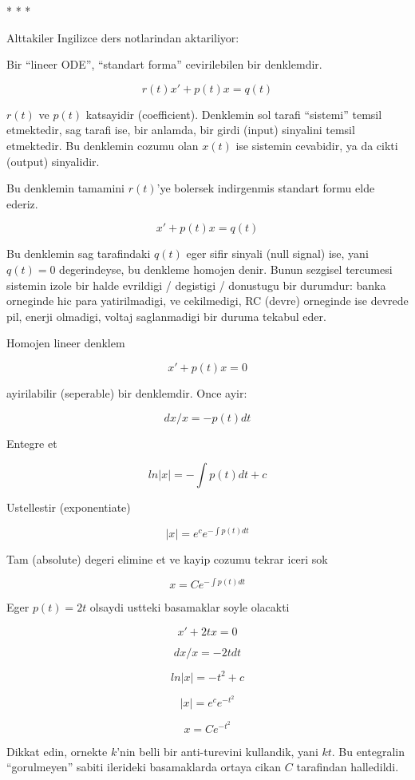 \documentclass[12pt,fleqn]{article}
\begin{document}
* * *

Alttakiler Ingilizce ders notlarindan aktariliyor:

Bir ``lineer ODE'', ``standart forma'' cevirilebilen bir denklemdir.

\[ r(t)x' + p(t)x = q(t) \]

$r(t)$ ve $p(t)$ katsayidir (coefficient). Denklemin sol tarafi ``sistemi''
temsil etmektedir, sag tarafi ise, bir anlamda, bir girdi (input) sinyalini
temsil etmektedir. Bu denklemin cozumu olan $x(t)$ ise sistemin cevabidir,
ya da cikti (output) sinyalidir. 

Bu denklemin tamamini $r(t)$'ye bolersek indirgenmis standart formu elde
ederiz. 

\[ x' + p(t)x = q(t) \]

Bu denklemin sag tarafindaki $q(t)$ eger sifir sinyali (null signal) ise,
yani $q(t) = 0$ degerindeyse, bu denkleme homojen denir. Bunun sezgisel
tercumesi sistemin izole bir halde evrildigi / degistigi / donustugu bir
durumdur: banka orneginde hic para yatirilmadigi, ve cekilmedigi, RC
(devre) orneginde ise devrede pil, enerji olmadigi, voltaj saglanmadigi bir
duruma tekabul eder. 

Homojen lineer denklem

\begin{equation}\label{4eq1}
x' + p(t) x = 0 
\end{equation}

ayirilabilir (seperable) bir denklemdir. Once ayir:

\[ dx/x = - p(t) dt \]

Entegre et

\[ ln|x| = - \int p(t) dt + c \]

Ustellestir (exponentiate)

\[ |x| = e^c e^{ - \int p(t) dt } \]

Tam (absolute) degeri elimine et ve kayip cozumu tekrar iceri sok

\[ x = C e^{- \int p(t) dt} \]

Eger $p(t) = 2t$ olsaydi ustteki basamaklar soyle olacakti

\[ x' + 2tx = 0 \]

\[ dx/x = - 2t dt \]

\[ ln|x| = - t^2 + c \]

\[ |x| = e^c e^{-t^2} \]

\[ x = C e^{-t^2} \]

Dikkat edin, ornekte $k$'nin belli bir anti-turevini kullandik, yani
$kt$. Bu entegralin ``gorulmeyen'' sabiti ilerideki basamaklarda ortaya
cikan $C$ tarafindan halledildi. 
\end{document}
